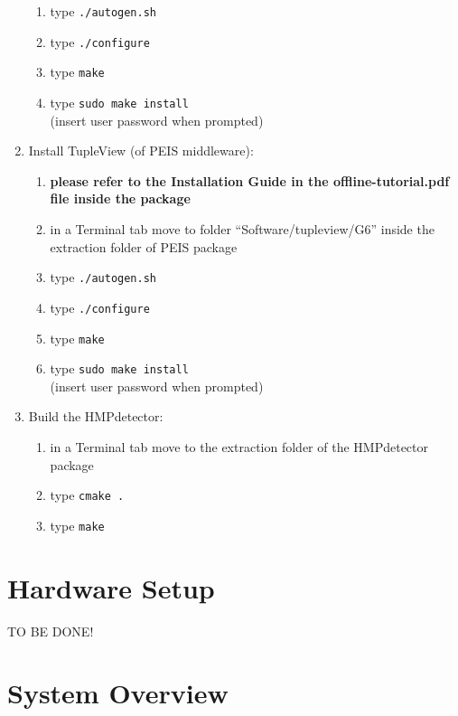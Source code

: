 \documentclass[10pt,a4paper]{report}
\begin{document}
\begin{enumerate}
\begin{enumerate}
\item type \verb+./autogen.sh+
\item type \verb+./configure+
\item type \verb+make+
\item type \verb+sudo make install+\\
(insert user password when prompted)
\end{enumerate}
\item Install TupleView (of PEIS middleware):
\begin{enumerate}
\item \textbf{please refer to the Installation Guide in the offline-tutorial.pdf file inside the package}
\item in a Terminal tab move to folder “Software/tupleview/G6” inside the extraction folder of PEIS package
\item type \verb+./autogen.sh+
\item type \verb+./configure+
\item type \verb+make+
\item type \verb+sudo make install+\\
(insert user password when prompted)
\end{enumerate}
\item Build the HMPdetector:
\begin{enumerate}
\item in a Terminal tab move to the extraction folder of the HMPdetector package
\item type \verb+cmake .+
\item type \verb+make+
\end{enumerate}
\end{enumerate}

\section{Hardware Setup}
TO BE DONE!

\section{System Overview}
\end{document}
